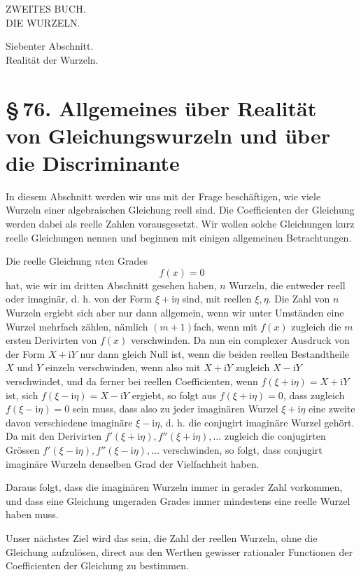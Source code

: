 \documentclass[11pt]{article}
\providecommand{\sect}[2]{\section*{\S\,#1. #2}}
\providecommand{\ii}{\mathrm{i}}
\begin{document}
\begin{center}
{\Large ZWEITES BUCH.}\\[1.6em]
{\LARGE DIE WURZELN.}
\end{center}
\clearpage

\begin{center}
{\large Siebenter Abschnitt.}\\[0.6em]
{\Large Realit\"at der Wurzeln.}
\end{center}

\sect{76}{Allgemeines \"uber Realit\"at von Gleichungswurzeln und \"uber die Discriminante}

In diesem Abschnitt werden wir uns mit der Frage besch\"aftigen, wie viele Wurzeln einer algebraischen Gleichung reell sind. Die Coefficienten der Gleichung werden dabei als reelle Zahlen vorausgesetzt. Wir wollen solche Gleichungen kurz reelle Gleichungen nennen und beginnen mit einigen allgemeinen Betrachtungen.

Die reelle Gleichung $n$ten Grades
\[
        f(x)=0
\]
hat, wie wir im dritten Abschnitt gesehen haben, $n$ Wurzeln, die entweder reell oder imagin\"ar, d. h. von der Form $\xi+\ii\eta$ sind, mit reellen $\xi,\eta$. Die Zahl von $n$ Wurzeln ergiebt sich aber nur dann allgemein, wenn wir unter Umst\"anden eine Wurzel mehrfach z\"ahlen, n\"amlich $(m+1)$fach, wenn mit $f(x)$ zugleich die $m$ ersten Derivirten von $f(x)$ verschwinden. Da nun ein complexer Ausdruck von der Form $X+\ii Y$ nur dann gleich Null ist, wenn die beiden reellen Bestandtheile $X$ und $Y$ einzeln verschwinden, wenn also mit $X+\ii Y$ zugleich $X-\ii Y$ verschwindet, und da ferner bei reellen Coefficienten, wenn $f(\xi+\ii\eta)=X+\ii Y$ ist, sich $f(\xi-\ii\eta)=X-\ii Y$ ergiebt, so folgt aus $f(\xi+\ii\eta)=0$, dass zugleich $f(\xi-\ii\eta)=0$ sein muss, dass also zu jeder imagin\"aren Wurzel $\xi+\ii\eta$ eine zweite davon verschiedene imagin\"are $\xi-\ii\eta$, d. h. die conjugirt imagin\"are Wurzel geh\"ort. Da mit den Derivirten $f'(\xi+\ii\eta), f''(\xi+\ii\eta),\ldots$ zugleich die conjugirten Gr\"ossen $f'(\xi-\ii\eta), f''(\xi-\ii\eta),\ldots$ verschwinden, so folgt, dass conjugirt imagin\"are Wurzeln denselben Grad der Vielfachheit haben.

Daraus folgt, dass die imagin\"aren Wurzeln immer in gerader Zahl vorkommen, und dass eine Gleichung ungeraden Grades immer mindestens eine reelle Wurzel haben muss.

Unser n\"achstes Ziel wird das sein, die Zahl der reellen Wurzeln, ohne die Gleichung aufzul\"osen, direct aus den Werthen gewisser rationaler Functionen der Coefficienten der Gleichung zu bestimmen.
\end{document}
